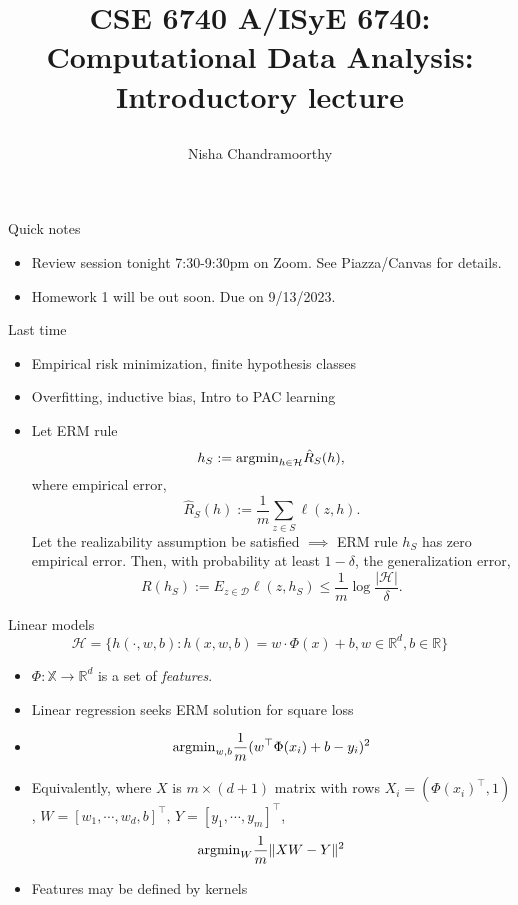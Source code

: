 \documentclass[final]{beamer}
\title{\begin{huge}{CSE 6740 A/ISyE 6740: Computational Data Analysis: Introductory lecture}\end{huge}} %
\author{Nisha Chandramoorthy} %
\begin{document}
\frame{\titlepage}

\begin{frame}{Quick notes}
\begin{itemize}
	\item Review session tonight 7:30-9:30pm on Zoom. See Piazza/Canvas for details.
	\item Homework 1 will be out soon. Due on 9/13/2023.
\end{itemize}
\end{frame}
\begin{frame}{Last time}
\begin{itemize}
	\item Empirical risk minimization, finite hypothesis classes
	\pause 
	\item Overfitting, inductive bias, Intro to PAC learning
	\pause 
\item Let ERM rule $$h_S := {\rm argmin}_{h\in \mathcal{H}} \hat{R}_S(h),$$ where empirical error, $$\hat{R}_S(h) := \dfrac{1}{m} \sum_{z \in S}\ell(z,h).$$ Let the realizability assumption be satisfied $\implies$ ERM rule $h_S$ has zero empirical error. Then, with probability at least $1-\delta$, the generalization error, 
	$$R(h_S) := E_{z\in \mathcal{D}} \ell(z, h_S) \leq \dfrac{1}{m} \log\dfrac{|\mathcal{H}|}{\delta}.$$
\end{itemize}
\end{frame}
\begin{frame}{Linear models}
	\begin{equation}
		\mathcal{H} = \{h(\cdot, w, b): h(x, w, b) = w\cdot \Phi(x) + b, w \in \mathbb{R}^d, b \in \mathbb{R} \}
	\end{equation}
\pause
\begin{itemize}
	\item $\Phi: \mathbb{X} \to \mathbb{R}^d$ is a set of \emph{features}.
	\pause
	\item Linear regression seeks ERM solution for square loss
	\pause
	\item $${\rm arg min}_{w, b} \dfrac{1}{m} (w^\top \Phi(x_i) + b - y_i)^2$$
	\pause 
\item Equivalently, where $X$ is $m\times (d+1)$ matrix with rows $X_i = (\Phi(x_i)^\top, 1)$, $W = [w_1, \cdots, w_d, b]^\top$, $Y = [y_1, \cdots, y_m]^\top$,
	\pause
	$$ {\rm arg min}_{W} \dfrac{1}{m} \|X W - Y\|^2$$
\item Features may be defined by kernels
\end{itemize}
\end{frame}
\end{document}
